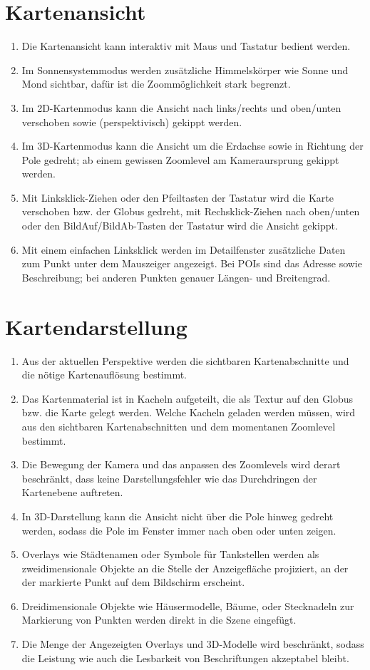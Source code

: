 \documentclass[10pt]{scrreprt}
\begin{document}
\section{Kartenansicht}
\begin{enumerate}[leftmargin=2cm,resume]
\item Die Kartenansicht kann interaktiv mit Maus und Tastatur bedient werden.
\item \W Im Sonnensystemmodus werden zusätzliche Himmelskörper wie Sonne und Mond sichtbar, dafür ist die Zoommöglichkeit stark begrenzt.
\item Im 2D-Kartenmodus kann die Ansicht nach links/rechts und oben/unten verschoben sowie (perspektivisch) gekippt werden. 
\item Im 3D-Kartenmodus kann die Ansicht um die Erdachse sowie in Richtung der Pole gedreht; ab einem gewissen Zoomlevel am Kameraursprung gekippt werden.
\item Mit Linksklick-Ziehen oder den Pfeiltasten der Tastatur wird die Karte verschoben bzw. der Globus gedreht, mit Rechsklick-Ziehen nach oben/unten oder den BildAuf/BildAb-Tasten der Tastatur wird die Ansicht gekippt.
\item \W Mit einem einfachen Linksklick werden im Detailfenster zusätzliche Daten zum Punkt unter dem Mauszeiger angezeigt. Bei POIs sind das Adresse sowie Beschreibung; bei anderen Punkten genauer Längen- und Breitengrad.
\end{enumerate}
\section{Kartendarstellung}
\begin{enumerate}[leftmargin=2cm,resume]
\item Aus der aktuellen Perspektive werden die sichtbaren Kartenabschnitte und die nötige Kartenauflösung bestimmt.
\item Das Kartenmaterial ist in Kacheln aufgeteilt, die als Textur auf den Globus bzw. die Karte gelegt werden. Welche Kacheln geladen werden müssen, wird  aus den sichtbaren Kartenabschnitten und dem momentanen Zoomlevel bestimmt.
\item Die Bewegung der Kamera und das anpassen des Zoomlevels wird derart beschränkt, dass keine Darstellungsfehler wie das Durchdringen der Kartenebene auftreten.
\item In 3D-Darstellung kann die Ansicht nicht über die Pole hinweg gedreht werden, sodass die Pole im Fenster immer nach oben oder unten zeigen.
\item Overlays wie Städtenamen oder Symbole für Tankstellen werden als zweidimensionale Objekte an die Stelle der Anzeigefläche projiziert, an der der markierte Punkt auf dem Bildschirm erscheint.
\item \W Dreidimensionale Objekte wie Häusermodelle, Bäume, oder Stecknadeln zur Markierung von Punkten werden direkt in die Szene eingefügt.
\item \W Die Menge der Angezeigten Overlays und 3D-Modelle wird beschränkt, sodass die Leistung wie auch die Lesbarkeit von Beschriftungen akzeptabel bleibt.
\end{enumerate}
\end{document}

